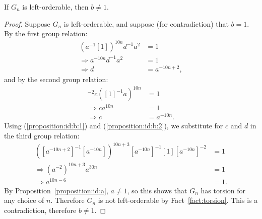\begin{proposition}
If $G_n$ is left-orderable, then $b\neq1$.
\label{proposition:id:b}
\end{proposition}
\begin{proof}
Suppose $G_n$ is left-orderable, and suppose (for contradiction) that $b=1$. By the first group relation:
\begin{align}
(a{}^{-1}[1])^{10n}d^{-1}a^{2} & =1\nonumber\\
\Rightarrow a^{-10n}d^{-1}a^{2} & =1\nonumber\\
\Rightarrow d & =a^{-10n+2},\label{proposition:id:b:1}
\end{align}
and by the second group relation:
\begin{align}
[1]^{-2}c([1]^{-1}a)^{10n} & =1\nonumber\\
\Rightarrow ca^{10n} & =1\nonumber\\
\Rightarrow c & =a^{-10n}.\label{proposition:id:b:2}
\end{align}
Using (\ref{proposition:id:b:1}) and (\ref{proposition:id:b:2}), we substitute for $c$ and $d$ in the third group relation:
\begin{align}
([a^{-10n+2}]^{-1}[a^{-10n}])^{10n+3}[a^{-10n}]^{-1}[1][a^{-10n}]^{-2} & =1\nonumber\\
\Rightarrow(a^{-2})^{10n+3}a^{30n} & =1\nonumber\\
\Rightarrow a^{10n-6} & =1.\nonumber
\end{align}
By Proposition~\ref{proposition:id:a}, $a\neq1$, so this shows that $G_{n}$
has torsion for any choice of $n$. Therefore $G_{n}$ is not left-orderable by Fact~\ref{fact:torsion}. This is a contradiction, therefore $b\neq{}1$.
\end{proof}

